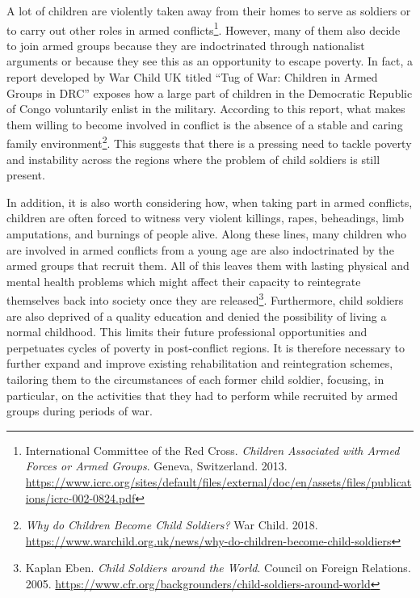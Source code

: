 A lot of children are violently taken away from their homes to serve as soldiers or to carry out other roles in armed conflicts\footnote{International Committee of the Red Cross. \emph{Children Associated with Armed Forces or Armed Groups}. Geneva, Switzerland. 2013. \url{https://www.icrc.org/sites/default/files/external/doc/en/assets/files/publications/icrc-002-0824.pdf}}. However, many of them also decide to join armed groups because they are indoctrinated through nationalist arguments or because they see this as an opportunity to escape poverty. In fact, a report developed by War Child UK titled “Tug of War: Children in Armed Groups in DRC” exposes how a large part of children in the Democratic Republic of Congo voluntarily enlist in the military. According to this report, what makes them willing to become involved in conflict is the absence of a stable and caring family environment\footnote{\emph{Why do Children Become Child Soldiers?} War Child. 2018. \url{https://www.warchild.org.uk/news/why-do-children-become-child-soldiers}}. This suggests that there is a pressing need to tackle poverty and instability across the regions where the problem of child soldiers is still present.

In addition, it is also worth considering how, when taking part in armed conflicts, children are often forced to witness very violent killings, rapes, beheadings, limb amputations, and burnings of people alive. Along these lines, many children who are involved in armed conflicts from a young age are also indoctrinated by the armed groups that recruit them. All of this leaves them with lasting physical and mental health problems which might affect their capacity to reintegrate themselves back into society once they are released\footnote{Kaplan Eben. \emph{Child Soldiers around the World}. Council on Foreign Relations. 2005. \url{https://www.cfr.org/backgrounders/child-soldiers-around-world}}. Furthermore, child soldiers are also deprived of a quality education and denied the possibility of living a normal childhood. This limits their future professional opportunities and perpetuates cycles of poverty in post-conflict regions. It is therefore necessary to further expand and improve existing rehabilitation and reintegration schemes, tailoring them to the circumstances of each former child soldier, focusing, in particular, on the activities that they had to perform while recruited by armed groups during periods of war.

